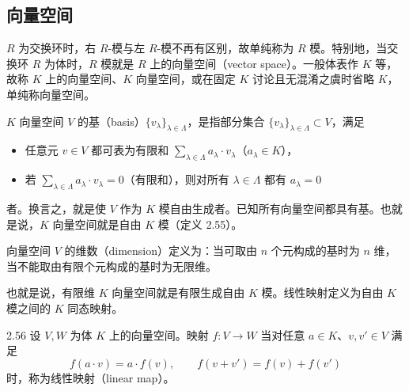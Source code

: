 
\subsection{向量空间}

$R$ 为交换环时，右 $R$-模与左 $R$-模不再有区别，故单纯称为 $R$ 模。特别地，当交换环 $R$ 为体时，$R$ 模就是 $R$ 上的向量空间（vector space）。一般体表作 $K$ 等，故称 $K$ 上的向量空间、$K$ 向量空间，或在固定 $K$ 讨论且无混淆之虞时省略 $K$，单纯称向量空间。

$K$ 向量空间 $V$ 的基（basis）$\{v_\lambda\}_{\lambda\in\Lambda}$，是指部分集合 $\{v_\lambda\}_{\lambda\in\Lambda}\subset V$，满足
\begin{itemize}
  \item 任意元 $v\in V$ 都可表为有限和 $\sum_{\lambda\in\Lambda}a_\lambda\cdot v_\lambda$（$a_\lambda\in K$），
  \item 若 $\sum_{\lambda\in\Lambda}a_\lambda\cdot v_\lambda=0$（有限和），则对所有 $\lambda\in\Lambda$ 都有 $a_\lambda=0$
\end{itemize}
者。换言之，就是使 $V$ 作为 $K$ 模自由生成者。已知所有向量空间都具有基。也就是说，$K$ 向量空间就是自由 $K$ 模（定义 2.55）。

向量空间 $V$ 的维数（dimension）定义为：当可取由 $n$ 个元构成的基时为 $n$ 维，当不能取由有限个元构成的基时为无限维。


也就是说，有限维 $K$ 向量空间就是有限生成自由 $K$ 模。线性映射定义为自由 $K$ 模之间的 $K$ 同态映射。

\begin{definition}{2.56} 设 $V,W$ 为体 $K$ 上的向量空间。映射 $f\colon V\to W$ 当对任意 $a\in K$、$v,v'\in V$ 满足
\[
  f(a\cdot v)=a\cdot f(v),\qquad f(v+v')=f(v)+f(v')
\]
时，称为线性映射（linear map）。\end{definition}

